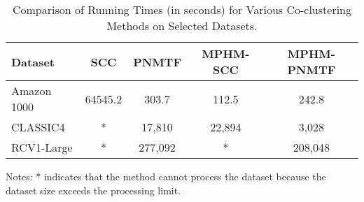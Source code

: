 
\begin{table*}[htbp]
    \centering
    \caption{Comparison of Running Times (in seconds) for Various Co-clustering Methods on Selected Datasets.}
    \label{tab:running-time}
    \begin{tabular}{@{} l cccc @{}}
        \toprule
        Dataset     & SCC \cite{dhillon2001CoclusteringDocumentsWords} & PNMTF \cite{chen2023ParallelNonNegativeMatrix} & \textbf{MPHM-SCC}  & \textbf{MPHM-PNMTF}   \\
        \midrule
        Amazon 1000 & 64545.2       & 303.7     & 112.5     & 242.8       \\
        CLASSIC4    & *            & 17,810    & 22,894    & 3,028       \\
        RCV1-Large  & *             & 277,092   & *         & 208,048     \\
        \bottomrule
    \end{tabular}
    \begin{tablenotes}
        \small
        \item Notes: * indicates that the method cannot process the dataset because the dataset size exceeds the processing limit.
    \end{tablenotes}
\end{table*}

